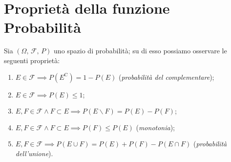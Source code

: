     \section{Proprietà della funzione Probabilità}
    \begin{prty}\label{prty:Proprietà_funzione_probabilità}
            Sia $(\Omega,\,\mathscr{F},\,P)$ uno spazio di probabilità; su di esso possiamo osservare le seguenti proprietà:
            \begin{enumerate}
                \item $E \in \mathscr{F} \implies P(E^{\text{C}}) = 1 - P(E)$ (\emph{probabilità del complementare});
                \item $E \in \mathscr{F} \implies P(E) \leq 1$;
                \item $E,F \in \mathscr{F} \land F \subset E \implies P(E \backslash F) = P(E) - P(F)$;
                \item $E,F \in \mathscr{F} \land F \subset E \implies P(F) \leq P(E)$ (\emph{monotonia});
                \item $E,F \in \mathscr{F} \implies P(E \cup F) = P(E) + P(F) - P(E \cap F)$ (\emph{probabilità dell'unione}).
            \end{enumerate}
        \end{prty}
